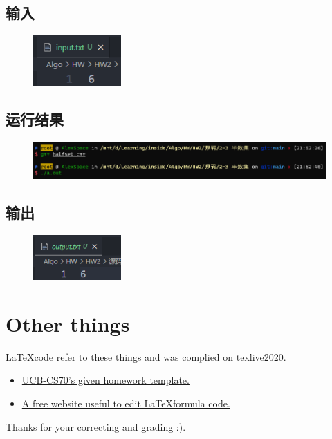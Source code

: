 \documentclass[11pt]{article}  %
\begin{document}
\subsection*{输入}

    \begin{figure}[H]
        \centering
        \includegraphics[width = 0.3\textwidth]{pic/2-2input.png}
    \end{figure}

\subsection*{运行结果}

    \begin{figure}[H]
        \centering
        \includegraphics[width = 1\textwidth]{pic/2-3res.png}
    \end{figure}

\subsection*{输出}

    \begin{figure}[H]
        \centering
        \includegraphics[width = 0.3\textwidth]{pic/2-3output.png}
    \end{figure}

\section*{Other things}

\LaTeX \space code refer to these things and was complied on texlive2020.
\begin{itemize}
    \item  \href{https://www.eecs70.org/assets/misc/homework_template.tex}{UCB-CS70's given homework template.} 
    \item  \href{https://www.latexlive.com}{A free website useful to edit \LaTeX \space formula code.}
\end{itemize}

Thanks for your correcting and grading :).
\end{document}
